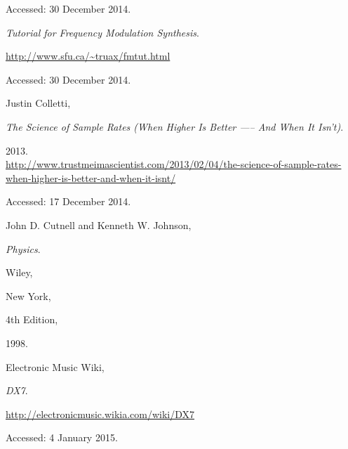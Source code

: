 \begin{thebibliography}{9}
  Accessed: 30 December 2014.


  \emph{Tutorial for Frequency Modulation Synthesis}.

  \url{http://www.sfu.ca/~truax/fmtut.html}

  Accessed: 30 December 2014.


  Justin Colletti,

  \emph{The Science of Sample Rates (When Higher Is Better —-- And When It Isn't)}.

  2013.\\
  \url{http://www.trustmeimascientist.com/2013/02/04/the-science-of-sample-rates-when-higher-is-better-and-when-it-isnt/}

  Accessed: 17 December 2014.


  John D. Cutnell and Kenneth W. Johnson,

  \emph{Physics}.

  Wiley,

  New York,

  4th Edition,

  1998.


  Electronic Music Wiki,

  \emph{DX7}.

  \url{http://electronicmusic.wikia.com/wiki/DX7}

  Accessed: 4 January 2015.

\end{thebibliography}
